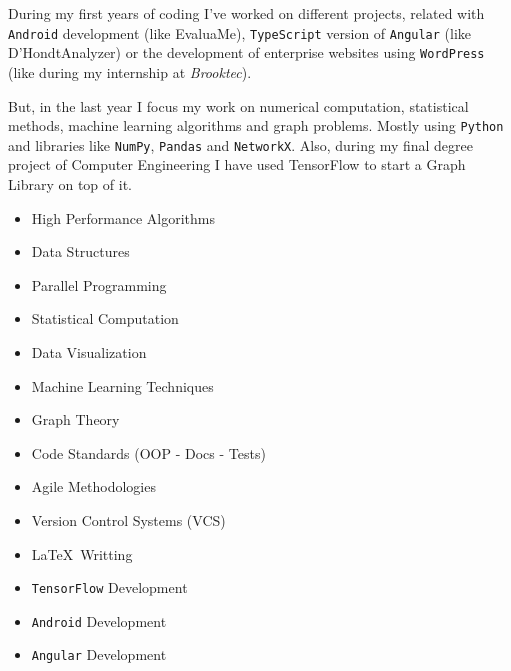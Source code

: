 \documentclass{friggeri-cv}
\begin{document}
    During my first years of coding I've worked on different projects, related with \texttt{Android} development (like EvaluaMe), \texttt{TypeScript} version of \texttt{Angular} (like D'HondtAnalyzer) or the development of enterprise websites using \texttt{WordPress} (like during my internship at \emph{Brooktec}).

    But, in the last year I focus my work on numerical computation, statistical methods, machine learning algorithms and graph problems. Mostly using \texttt{Python} and libraries like \texttt{NumPy}, \texttt{Pandas} and \texttt{NetworkX}. Also, during my final degree project of Computer Engineering I have used TensorFlow to start a Graph Library on top of it.

    \noindent
    \begin{minipage}[t]{0.5\linewidth}
      \begin{itemize}
      	\item{High Performance Algorithms}
  	    \item{Data Structures}
        \item{Parallel Programming}
        \item{Statistical Computation}
        \item{Data Visualization}
        \item{Machine Learning Techniques}
        \item{Graph Theory}
      \end{itemize}
    \end{minipage}%
    \begin{minipage}[t]{0.5\linewidth}
      \begin{itemize}
        \item{Code Standards (OOP - Docs - Tests)}
        \item{Agile Methodologies}
        \item{Version Control Systems (VCS)}
      	\item{\LaTeX \ Writting}
        \item{\texttt{TensorFlow} Development}
        \item{\texttt{Android} Development}
        \item{\texttt{Angular} Development}
      \end{itemize}
    \end{minipage}
    \par\bigskip

\end{document}
